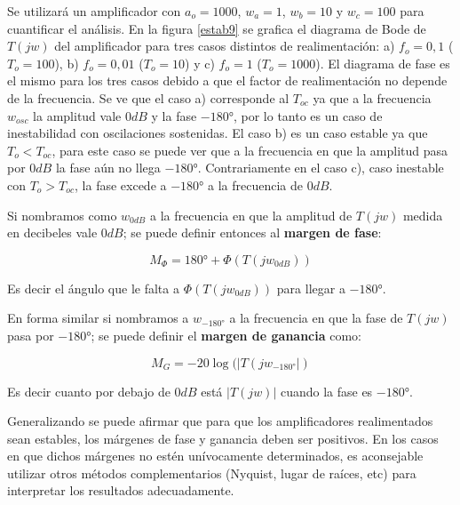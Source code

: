 Se utilizará un amplificador con $a_o=1000$, $w_a=1$, $w_b=10$ y
$w_c=100$ para cuantificar el análisis. En la figura \ref{estab9} se
grafica el diagrama de Bode de $T(jw)$ del amplificador para tres
casos distintos de realimentación: a) $f_o=0,1$ ($T_o=100$), b)
$f_o=0,01$ ($T_o=10$) y c) $f_o=1$ ($T_o=1000$). El diagrama de fase
es el mismo para los tres casos debido a que el factor de
realimentación no depende de la frecuencia. Se ve que el caso a)
corresponde al $T_{oc}$ ya que a la frecuencia $w_{osc}$ la amplitud
vale $0 dB$ y la fase $-180°$, por lo tanto es un caso de
inestabilidad con oscilaciones sostenidas. El caso b) es un caso
estable ya que $T_o < T_{oc}$, para este caso se puede ver que a la
frecuencia en que la amplitud pasa por $0 dB$ la fase aún no llega
$-180°$. Contrariamente en el caso c), caso inestable con $T_o >
T_{oc}$, la fase excede a $-180°$ a la frecuencia de $0 dB$.

Si nombramos como $w_{0dB}$ a la frecuencia en que la amplitud de
$T(jw)$ medida en decibeles vale $0 dB$; se puede definir entonces
al \textbf{margen de fase}:

	\begin{equation}
		\nonumber
		M_\Phi=180°+\Phi(T(jw_{0dB}))
	\end{equation}

Es decir el ángulo que le falta a $\Phi(T(jw_{0dB}))$ para llegar a
$-180°$.

En forma similar si nombramos a $w_{-180°}$ a la frecuencia en que
la fase de $T(jw)$ pasa por $-180°$; se puede definir el
\textbf{margen de ganancia} como:

	\begin{equation}
		\nonumber
		M_G=-20 \log(|T(jw_{-180°}|)
	\end{equation}

Es decir cuanto por debajo de $0dB$ está $|T(jw)|$ cuando la fase es
$-180°$.

Generalizando se puede afirmar que para que los amplificadores
realimentados sean estables, los márgenes de fase y ganancia deben
ser positivos. En los casos en que dichos márgenes no estén
unívocamente determinados, es aconsejable utilizar otros métodos
complementarios (Nyquist, lugar de raíces, etc) para interpretar los
resultados adecuadamente.

